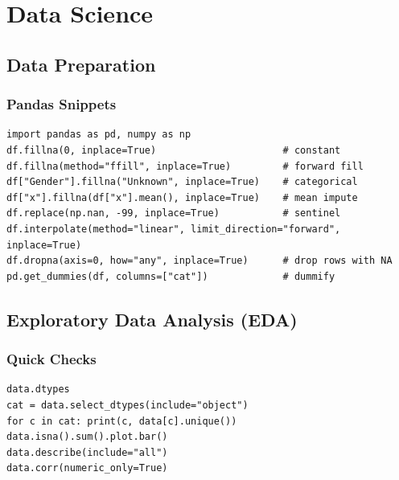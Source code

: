 \chapter{Data Science}

\section{Data Preparation}
\subsection*{Pandas Snippets}
\begin{lstlisting}
import pandas as pd, numpy as np
df.fillna(0, inplace=True)                      # constant
df.fillna(method="ffill", inplace=True)         # forward fill
df["Gender"].fillna("Unknown", inplace=True)    # categorical
df["x"].fillna(df["x"].mean(), inplace=True)    # mean impute
df.replace(np.nan, -99, inplace=True)           # sentinel
df.interpolate(method="linear", limit_direction="forward", inplace=True)
df.dropna(axis=0, how="any", inplace=True)      # drop rows with NA
pd.get_dummies(df, columns=["cat"])             # dummify
\end{lstlisting}

\section{Exploratory Data Analysis (EDA)}
\subsection*{Quick Checks}
\begin{lstlisting}
data.dtypes
cat = data.select_dtypes(include="object")
for c in cat: print(c, data[c].unique())
data.isna().sum().plot.bar()
data.describe(include="all")
data.corr(numeric_only=True)
\end{lstlisting}


